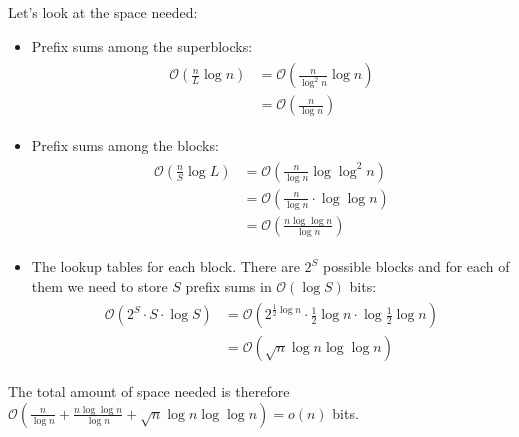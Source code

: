 \begin{Proof}
  Let's look at the space needed:
  \begin{itemize}
    \item Prefix sums among the superblocks:
    \begin{align}
      \begin{aligned}
        \mathcal{O}\left(\frac{n}{L}\log n\right)
        &= \mathcal{O}\left(\frac{n}{\log^2 n}\log n\right)\\
        &= \mathcal{O}\left(\frac{n}{\log n}\right)
      \end{aligned}
    \end{align}
    \item Prefix sums among the blocks:
    \begin{align}
      \begin{aligned}
        \mathcal{O}\left(\frac{n}{S}\log L\right)
        &= \mathcal{O}\left(\frac{n}{\log n}\log\log^2 n\right) \\
        &= \mathcal{O}\left(\frac{n}{\log n} \cdot \log\log n\right) \\
        &= \mathcal{O}\left(\frac{n \log\log n}{\log n}\right)
      \end{aligned}
    \end{align}
    \item The lookup tables for each block. There are $2^S$ possible blocks and for each of them we need to store $S$ prefix sums in $\mathcal{O}(\log S)$ bits:
    \begin{align}
      \begin{aligned}
        \mathcal{O}\left(2^S \cdot S \cdot \log S\right)
        &= \mathcal{O}\left(2^{\frac{1}{2}\log n} \cdot \frac{1}{2}\log n \cdot \log \frac{1}{2}\log n\right) \\
        &= \mathcal{O}\left(\sqrt{n}\log n \log\log n\right)
      \end{aligned}
    \end{align}
  \end{itemize}

  The total amount of space needed is therefore $\mathcal{O}\left(\frac{n}{\log n} + \frac{n\log\log n}{\log n} + \sqrt{n}\log n\log\log n\right) = o(n)$ bits.
\end{Proof}
